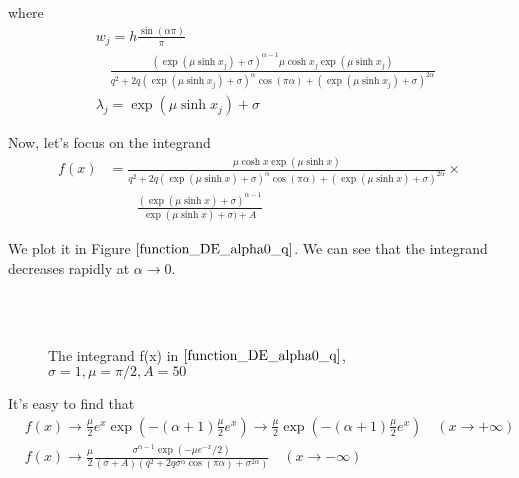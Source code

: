 where
\begin{equation}
	\begin{aligned}
		& w_j=h\frac{\sin(\alpha\pi)}{\pi}\\
		&\quad \frac{(\exp(\mu \sinh x_j)+\sigma)^{\alpha-1}\mu \cosh x_j\exp(\mu \sinh x_j)}{q^2+2q(\exp(\mu \sinh x_j)+\sigma)^{\alpha}\cos(\pi\alpha)+(\exp(\mu \sinh x_j)+\sigma)^{2\alpha}}\\
		& \lambda_j=\exp(\mu\sinh x_j)+\sigma
	\end{aligned}
\label{lw_DE0_q}
\end{equation}

Now, let's focus on the integrand
\begin{equation}
	\begin{aligned}
		f(x)&=\frac{\mu \cosh x\exp(\mu \sinh x)}{q^2+2q(\exp(\mu \sinh x)+\sigma)^{\alpha}\cos(\pi\alpha)+(\exp(\mu \sinh x)+\sigma)^{2\alpha}} \times\\
		&\qquad \frac{(\exp(\mu \sinh x)+\sigma)^{\alpha-1}}{\exp(\mu \sinh x)+\sigma)+{A}}
	\end{aligned}
	\label{function_DE_alpha0_q}
\end{equation}



We plot it in Figure $\ref{function_DE_alpha0_q}$.  We can see that the integrand decreases rapidly at $\alpha \rightarrow 0$.
\begin{figure}[htbp]
	\centering
	~~
	~~
	\\
	~~
	~~
	\caption{The integrand f(x) in $\eqref{function_DE_alpha0_q}$, $\sigma=1,\mu=\pi/2,A=50$}
	\label{function_DE_alpha0_q}
\end{figure}

It's easy to find that
\begin{equation}
	\begin{aligned}
		& f(x) \rightarrow \frac{\mu}{2}e^x \exp(-(\alpha+1)\frac{\mu}{2}e^x)\rightarrow  \frac{\mu}{2} \exp(-(\alpha+1)\frac{\mu}{2}e^x) \quad(x\rightarrow +\infty)\\
		& f(x) \rightarrow \frac{\mu}{2} \frac{\sigma^{\alpha-1}\exp(-\mu e^{-x}/2)}{(\sigma+A)(q^2+2q\sigma^{\alpha}\cos(\pi\alpha)+\sigma^{2\alpha})} \quad(x\rightarrow -\infty)
	\end{aligned}
\end{equation}

